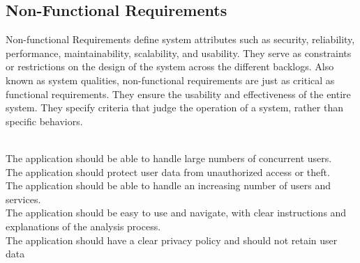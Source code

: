 \subsection{Non-Functional Requirements}
Non-functional Requirements define system attributes such as security,
reliability, performance, maintainability, scalability, and usability. They serve as
constraints or restrictions on the design of the system across the different backlogs.
Also known as system qualities, non-functional requirements are just as critical as
functional requirements. They ensure the usability and effectiveness of the entire
system. They specify criteria that judge the operation of a system, rather than specific
behaviors.

\begin{itemize}
     \vspace{0.2cm} \\
        The application should be able to handle large numbers of concurrent users.  
     \vspace{0.2cm} \\
        The application should protect user data from
        unauthorized access or theft.
     \vspace{0.2cm} \\
        The application should be able to handle an increasing number of users and services.
     \vspace{0.2cm} \\
        The application should be easy to use and navigate, with
        clear instructions and explanations of the analysis process.
     \vspace{0.2cm} \\
        The application should have a clear privacy policy and
        should not retain user data
    
\end{itemize}

\newpage

